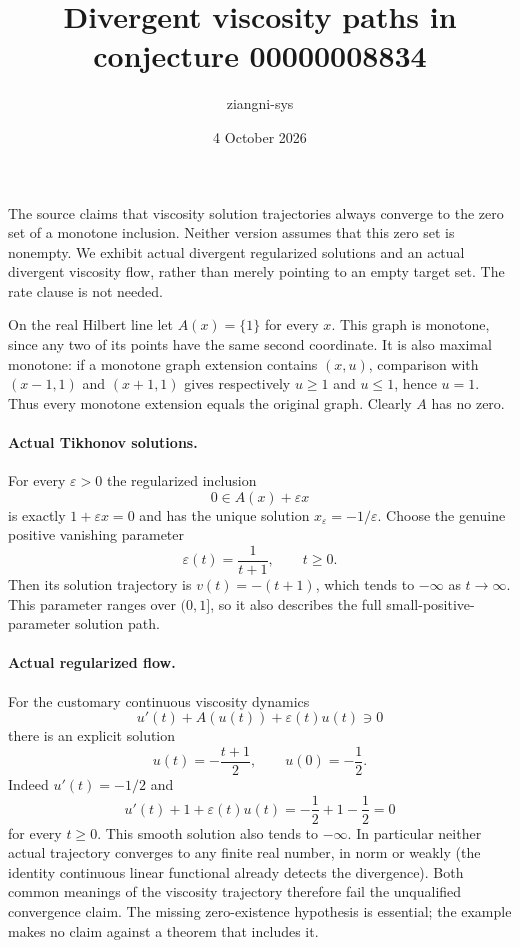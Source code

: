 \documentclass[11pt]{article}
\title{Divergent viscosity paths in conjecture 00000008834}
\author{ziangni-sys}
\date{4 October 2026}
\begin{document}
\maketitle
The source claims that viscosity solution trajectories always converge
to the zero set of a monotone inclusion. Neither version assumes that
this zero set is nonempty. We exhibit actual divergent regularized
solutions and an actual divergent viscosity flow, rather than merely
pointing to an empty target set. The rate clause is not needed.

On the real Hilbert line let $A(x)=\{1\}$ for every $x$. This graph is
monotone, since any two of its points have the same second coordinate.
It is also maximal monotone: if a monotone graph extension contains
$(x,u)$, comparison with $(x-1,1)$ and $(x+1,1)$ gives respectively
$u\ge1$ and $u\le1$, hence $u=1$. Thus every monotone extension equals
the original graph. Clearly $A$ has no zero.

\paragraph{Actual Tikhonov solutions.}
For every $\varepsilon>0$ the regularized inclusion
\[
0\in A(x)+\varepsilon x
\]
is exactly $1+\varepsilon x=0$ and has the unique solution
$x_\varepsilon=-1/\varepsilon$. Choose the genuine positive vanishing
parameter
\[
\varepsilon(t)=\frac1{t+1},\qquad t\ge0.
\]
Then its solution trajectory is $v(t)=-(t+1)$, which tends to
$-\infty$ as $t\to\infty$. This parameter ranges over $(0,1]$, so it
also describes the full small-positive-parameter solution path.

\paragraph{Actual regularized flow.}
For the customary continuous viscosity dynamics
\[
u'(t)+A(u(t))+\varepsilon(t)u(t)\ni0
\]
there is an explicit solution
\[
u(t)=-\frac{t+1}{2},\qquad u(0)=-\frac12.
\]
Indeed $u'(t)=-1/2$ and
\[
u'(t)+1+\varepsilon(t)u(t)
=-\frac12+1-\frac12=0
\]
for every $t\ge0$. This smooth solution also tends to $-\infty$.
In particular neither actual trajectory converges to any finite real
number, in norm or weakly (the identity continuous linear functional
already detects the divergence). Both common meanings of the viscosity
trajectory therefore fail the unqualified convergence claim. The
missing zero-existence hypothesis is essential; the example makes no
claim against a theorem that includes it.
\end{document}
